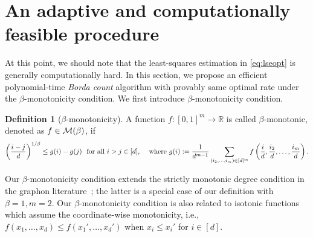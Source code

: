 \documentclass{article}
\theoremstyle{definition}
\newtheorem{defn}{Definition}
\begin{document}

\section{An adaptive and computationally feasible procedure}\label{sec:borda}
At this point, we should note that the least-squares estimation in \eqref{eq:lseopt} is generally computationally hard. In this section, we propose an efficient polynomial-time \emph{Borda count} algorithm with provably same optimal rate under the $\beta$-monotonicity condition. We first introduce $\beta$-monotonicity condition.  
\begin{defn}[$\beta$-monotonicity]\label{eq:defn}
A function $f\colon[0,1]^m \rightarrow \mathbb{R}$ is called $\beta$-monotonic, denoted as $f\in\mathcal{M}(\beta)$, if 
\begin{align}\label{eq:monotonic}
    \left({i-j\over d}\right)^{1/\beta}\leq g(i)-g(j)\ \ \text{for all $i>j\in[d]$,} \quad \text{ where } g(i): = \frac{1}{d^{m-1}}\sum_{(i_2,\ldots,i_m)\in[d]^m} f\left({i\over d},{i_2\over d},\ldots,{i_m\over d}\right).
\end{align}
\end{defn}\vspace{-.3cm}
Our $\beta$-monotonicity condition extends the strictly monotonic degree condition in the graphon literature~\citep{chan2014consistent}; the latter is a special case of our definition with $\beta=1, m=2$. Our $\beta$-monotonicity condition is also related to isotonic functions~\citep{han2019isotonic,pananjady2020isotonic} which assume the coordinate-wise monotonicity, i.e., $f(x_1,\ldots,x_d)\leq f(x_1',\ldots,x_d')$
when $x_i\leq x_i'$ for $i\in[d]$. 
\end{document}
